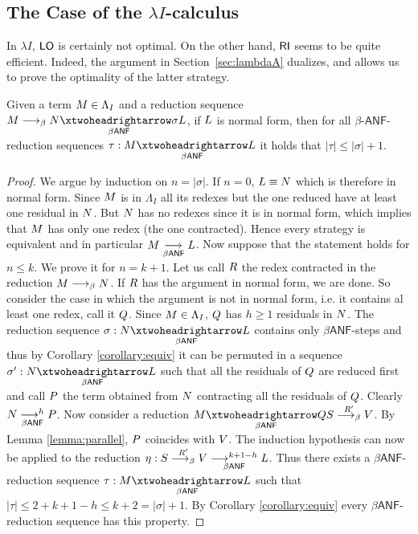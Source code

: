 \subsection{The Case of the $\lambda I$-calculus}
In $\lambda I$, $\textsf{LO}$ is certainly not optimal. On the other hand, $\textsf{RI}$ seems to be
quite efficient. Indeed, the argument in Section~\ref{sec:lambdaA} dualizes, and allows us to prove
the optimality of the latter strategy.
\begin{lemma}\label{lemma:insertion}
	Given a term $M\in\Lambda_I$ and a reduction sequence $\termone\redbeta\termtwo\redbetaredanf{\sigma}\termthree$, if $L$ is normal form, then for all $\beta$-$\mathsf{ANF}$-reduction sequences $\tau:\termone\redbetaredanf{}\termthree$ it holds that $|\tau|\leq |\sigma|+1$.
\end{lemma}
\begin{LONG}
	\begin{proof}
		We argue by induction on $n=|\sigma|$. If $n=0$, $L\equiv N$ which is therefore in normal form. Since $M$ is in $\Lambda_I$ all its redexes but the one reduced have at least one residual in $N$. But $N$ has no redexes since it is in normal form, which implies that $M$ has only one redex (the one contracted). Hence every strategy is equivalent and in particular $M\underset{\beta\textsf{ANF}}{\longrightarrow^{}}L$. Now suppose that the statement holds for $n\leq k$. We prove it for $n=k+1$. Let us call $R$ the redex contracted in the reduction $M\longrightarrow_\beta N$. If $R$ has the argument in normal form, we are done. So consider the case in which the argument is not in normal form, i.e. it contains al least one redex, call it $Q$. Since $M\in\Lambda_I$, $Q$ has $h\geq 1$ residuals in $N$. The reduction sequence $\sigma: \termtwo\redbetaredanf{} \termthree$ contains only $\beta\mathsf{ANF}$-steps and thus by Corollary \ref{corollary:equiv} it can be permuted in a sequence $\sigma':\termtwo\redbetaredanf{} \termthree$ such that all the residuals of $Q$ are reduced first and call $P$ the term obtained from $N$ contracting all the residuals of $Q$. Clearly $N\underset{\beta\textsf{ANF}}{\longrightarrow^{h}}P$. Now consider a reduction $\termone\redbetaredanf{\rdxtwo}\termfive\redbetardx{\rdxone'}\termsix$. By Lemma \ref{lemma:parallel}, $P$ coincides with $V$. The induction hypothesis can now be applied to the reduction $\eta:S\overset{R'}{\longrightarrow_\beta}V\underset{\beta\textsf{ANF}}{\longrightarrow^{k+1-h}}L$. Thus there exists a $\beta\mathsf{ANF}$-reduction sequence $\tau:\termone\redbetaredanf{}\termthree$ such that $|\tau|\leq 2+k+1-h\leq k+2=|\sigma|+1$. By Corollary \ref{corollary:equiv} every $\beta\mathsf{ANF}$-reduction sequence has this property. 
	\end{proof}
\end{LONG}

